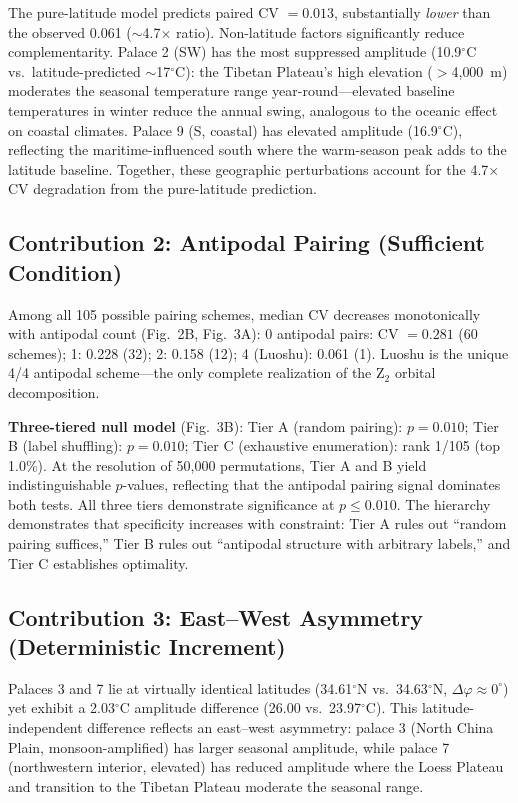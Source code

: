 \documentclass[9pt,twocolumn]{article}
\begin{document}
The pure-latitude model predicts paired CV $= 0.013$, substantially \textit{lower} than the observed 0.061 ($\sim$4.7$\times$ ratio). Non-latitude factors significantly reduce complementarity. Palace 2 (SW) has the most suppressed amplitude (10.9$^\circ$C vs.\ latitude-predicted $\sim$17$^\circ$C): the Tibetan Plateau's high elevation ($>$4{,}000~m) moderates the seasonal temperature range year-round---elevated baseline temperatures in winter reduce the annual swing, analogous to the oceanic effect on coastal climates. Palace 9 (S, coastal) has elevated amplitude (16.9$^\circ$C), reflecting the maritime-influenced south where the warm-season peak adds to the latitude baseline. Together, these geographic perturbations account for the 4.7$\times$ CV degradation from the pure-latitude prediction.

\subsection*{Contribution 2: Antipodal Pairing (Sufficient Condition)}

Among all 105 possible pairing schemes, median CV decreases monotonically with antipodal count (Fig.~2B, Fig.~3A): 0 antipodal pairs: CV $= 0.281$ (60 schemes); 1: 0.228 (32); 2: 0.158 (12); 4 (Luoshu): 0.061 (1). Luoshu is the unique 4/4 antipodal scheme---the only complete realization of the Z$_2$ orbital decomposition.

\textbf{Three-tiered null model} (Fig.~3B): Tier A (random pairing): $p = 0.010$; Tier B (label shuffling): $p = 0.010$; Tier C (exhaustive enumeration): rank 1/105 (top 1.0\%). At the resolution of 50{,}000 permutations, Tier A and B yield indistinguishable $p$-values, reflecting that the antipodal pairing signal dominates both tests. All three tiers demonstrate significance at $p \leq 0.010$. The hierarchy demonstrates that specificity increases with constraint: Tier A rules out ``random pairing suffices,'' Tier B rules out ``antipodal structure with arbitrary labels,'' and Tier C establishes optimality.

\subsection*{Contribution 3: East--West Asymmetry (Deterministic Increment)}

Palaces 3 and 7 lie at virtually identical latitudes (34.61$^\circ$N vs.\ 34.63$^\circ$N, $\Delta\varphi \approx 0^\circ$) yet exhibit a 2.03$^\circ$C amplitude difference (26.00 vs.\ 23.97$^\circ$C). This latitude-independent difference reflects an east--west asymmetry: palace 3 (North China Plain, monsoon-amplified) has larger seasonal amplitude, while palace 7 (northwestern interior, elevated) has reduced amplitude where the Loess Plateau and transition to the Tibetan Plateau moderate the seasonal range.
\end{document}

